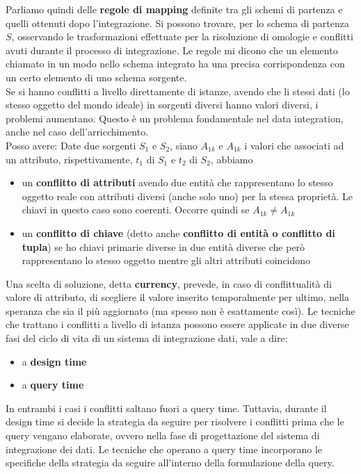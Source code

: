 Parliamo quindi delle \textbf{regole di mapping} definite tra gli schemi di partenza e quelli ottenuti dopo l'integrazione. 
Si possono trovare, per lo schema di partenza $S$, osservando le trasformazioni effettuate per la risoluzione di omologie e conflitti avuti durante il processo di integrazione. Le regole mi dicono che un elemento chiamato in un modo nello schema integrato ha una precisa corrispondenza con un certo elemento di uno schema sorgente.\\
Se si hanno conflitti a livello direttamente di istanze, avendo che li stessi dati (lo stesso oggetto del mondo ideale) in sorgenti diversi hanno valori diversi, i problemi aumentano. Questo è un problema fondamentale nel data integration, anche nel caso dell'arricchimento. \\
Posso avere:
Date due sorgenti $S_1$ e $S_2$, siano $A_{1k}$ e $A_{1k}$ i valori che associati ad un attributo, rispettivamente, $t_1$ di $S_1$ e $t_2$ di $S_2$, abbiamo
\begin{itemize}
  \item un \textbf{conflitto di attributi} avendo due entità che rappresentano lo stesso oggetto reale con attributi diversi (anche solo uno) per la stessa proprietà. Le chiavi in questo caso sono coerenti. Occorre quindi se $A_{1k} \neq A_{1k}$
  \item un \textbf{conflitto di chiave} (detto anche \textbf{conflitto di entità \textnormal{o} conflitto di tupla}) se ho chiavi primarie diverse in due entità diverse che però rappresentano lo stesso oggetto mentre gli altri attributi coincidono
\end{itemize}
Una scelta di soluzione, detta \textbf{currency}, prevede, in caso di conflittualità di valore di attributo, di scegliere il valore inserito temporalmente per ultimo, nella speranza che sia il più aggiornato (ma spesso non è esattamente così). Le tecniche che trattano i conflitti a livello di istanza possono essere applicate in due diverse fasi del ciclo di vita di un sistema di integrazione dati, vale a dire:
\begin{itemize}
  \item a \textbf{design time}
  \item a \textbf{query time}
\end{itemize}
In entrambi i casi i conflitti saltano fuori a query time. Tuttavia, durante il design time si decide la strategia da seguire per risolvere i conflitti prima che le query vengano elaborate, ovvero nella fase di progettazione del sistema di integrazione dei dati. Le tecniche che operano a query time incorporano le specifiche della strategia da seguire all'interno della formulazione della query. 
